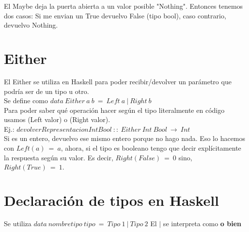 \documentclass[10pt,a4paper]{article}
\begin{document}
El Maybe deja la puerta abierta a un valor posible "Nothing". Entonces tenemos dos casos: Si me envian un True devuelvo False (tipo bool), caso contrario, devuelvo Nothing. 

\section*{Either}
El Either se utiliza en Haskell para poder recibir/devolver un parámetro que podría ser de un tipo u otro. \\
Se define como $ data \ Either \ a \ b \ = \ Left \ a \ | \ Right \ b $ \\

Para poder saber qué operación hacer según el tipo literalmente en código usamos (Left valor) o (Right valor). \\

Ej.: $ devolverRepresentacionIntBool \ :: \ Either \ Int \ Bool \ \rightarrow \ Int $ \\

Si es un entero, devuelvo ese mismo entero porque no hago nada. Eso lo hacemos con $Left(a) \ = \ a$, ahora, si el tipo es booleano tengo que decir explícitamente la respuesta según su valor. Es decir, $Right(False) \ = \ 0$ sino, $Right(True) \ = \ 1$.

\section*{Declaración de tipos en Haskell}
Se utiliza $data \ nombretipo \ tipo \ = \ Tipo \ 1 \ | \ Tipo \ 2$ 
El $|$ se interpreta como \textbf{o bien}
\end{document}
